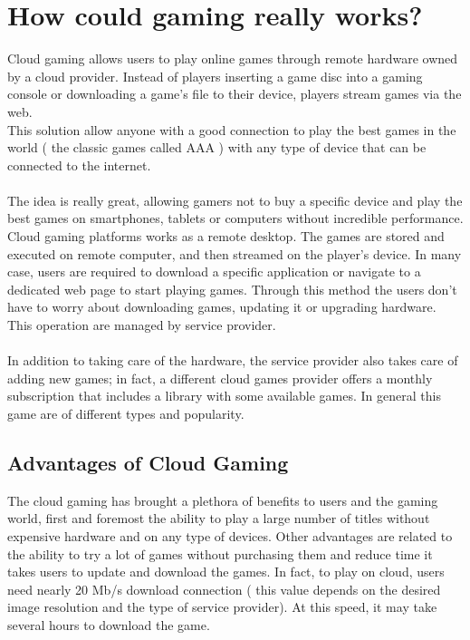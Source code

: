 \documentclass[a4paper,12pt]{report}
\begin{document}
\section{How could gaming really works?}
Cloud gaming allows users to play online games through remote hardware owned by a cloud provider. Instead of players inserting a game disc into a gaming console or downloading a game’s file to their device, players stream games via the web.\\
This solution allow anyone with a good connection to play the best games in the world ( the classic games called AAA ) with any type of device that can be connected to the internet.\\\\
The idea is really great, allowing gamers not to buy a specific device and play the best games on smartphones, tablets or computers without incredible performance. \\
%
Cloud gaming platforms works as a remote desktop. The games are stored and executed on remote computer, and then streamed on the player's device. In many case, users are required to download a specific application or navigate to a dedicated web page to start playing games. Through this method the users don't have to worry about downloading games, updating it or upgrading hardware. This operation are managed by service provider.\\\\
%
In addition to taking care of the hardware, the service provider also takes care of adding new games; in fact, a different cloud games provider offers a monthly subscription that includes a library with some available games. In general this game are of different types and popularity.\\
%
\subsection{Advantages of Cloud Gaming}
The cloud gaming has brought a plethora of benefits to users and the gaming world, first and foremost the ability to play a large number of titles without  expensive hardware and on any type of devices. Other advantages are related to the ability to try a lot of games without purchasing them and reduce time it takes users to update and download the games. In fact, to play on cloud, users need nearly 20 Mb/s download connection ( this value depends on the desired image resolution and the type of service provider). At this speed, it may take several hours to download the game. 
\newpage
%
\end{document}
